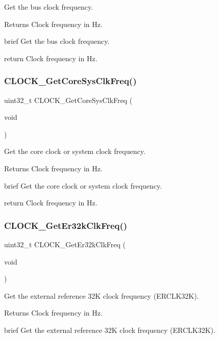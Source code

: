 Get the bus clock frequency. 

\begin{DoxyReturn}{Returns}
Clock frequency in Hz.
\end{DoxyReturn}
brief Get the bus clock frequency.

return Clock frequency in Hz. \mbox{\label{group__clock_ga3360f4c91fde2fed784359caf34aefd2}} 
\subsubsection{\texorpdfstring{CLOCK\_GetCoreSysClkFreq()}{CLOCK\_GetCoreSysClkFreq()}}
{\footnotesize\ttfamily uint32\+\_\+t C\+L\+O\+C\+K\+\_\+\+Get\+Core\+Sys\+Clk\+Freq (\begin{DoxyParamCaption}\item[{void}]{ }\end{DoxyParamCaption})}



Get the core clock or system clock frequency. 

\begin{DoxyReturn}{Returns}
Clock frequency in Hz.
\end{DoxyReturn}
brief Get the core clock or system clock frequency.

return Clock frequency in Hz. \mbox{\label{group__clock_ga37466efe335f7268cee76c7d01fd52f5}} 
\subsubsection{\texorpdfstring{CLOCK\_GetEr32kClkFreq()}{CLOCK\_GetEr32kClkFreq()}}
{\footnotesize\ttfamily uint32\+\_\+t C\+L\+O\+C\+K\+\_\+\+Get\+Er32k\+Clk\+Freq (\begin{DoxyParamCaption}\item[{void}]{ }\end{DoxyParamCaption})}



Get the external reference 32K clock frequency (E\+R\+C\+L\+K32K). 

\begin{DoxyReturn}{Returns}
Clock frequency in Hz.
\end{DoxyReturn}
brief Get the external reference 32K clock frequency (E\+R\+C\+L\+K32K).

